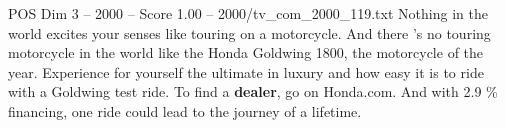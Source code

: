 \begin{textsample}{POS Dim 3 – 2000 – Score 1.00 – 2000/tv\_com\_2000\_119.txt}  \label{ex:f3_pos_085}
Nothing in the world excites your senses like touring on a motorcycle.
And there 's no touring motorcycle in the world like the Honda Goldwing 1800, the motorcycle of the year.
Experience for yourself the ultimate in luxury and how easy it is to ride with a Goldwing test ride.
To find a \textbf{dealer}, go on Honda.com.
And with 2.9 \% financing, one ride could lead to the journey of a lifetime.

\end{textsample}
